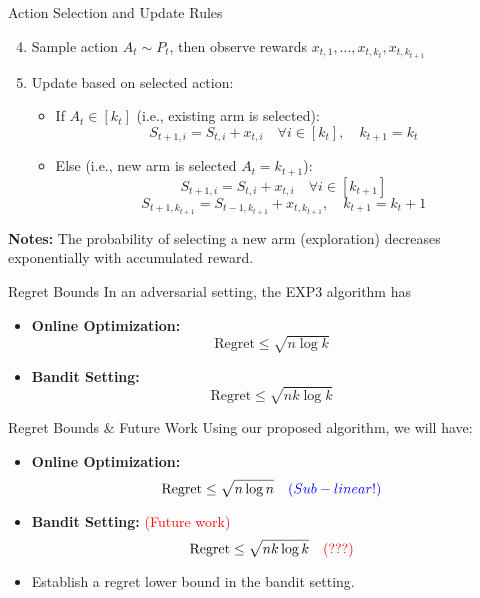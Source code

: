 \documentclass{beamer}
\begin{document}
\begin{frame}{Action Selection and Update Rules}
\begin{enumerate}
    \setcounter{enumi}{3}
    \item Sample action \( A_t \sim P_t \), then observe rewards \( x_{t,1}, \dots, x_{t,k_t}, x_{t,k_{t+1}} \)

    \item Update based on selected action:
    \begin{itemize}
        \item If \( A_t \in [k_t] \) (i.e., existing arm is selected):
        \[
        S_{t+1,i} = S_{t,i} + x_{t,i} \quad \forall i \in [k_t], \quad k_{t+1} = k_t
        \]

        \item Else (i.e., new arm is selected \( A_t = k_{t+1} \)):
        \[
        S_{t+1,i} = S_{t,i} + x_{t,i} \quad \forall i \in [k_{t+1}]
        \]
        \[
        S_{t+1,k_{t+1}} = S_{t-1,k_{t+1}} + x_{t,k_{t+1}}, \quad k_{t+1} = k_t + 1
        \]
    \end{itemize}
\end{enumerate}

\textbf{Notes:} The probability of selecting a new arm (exploration) decreases exponentially with accumulated reward.

\end{frame}


\begin{frame}{Regret Bounds}
In an adversarial setting, the EXP3 algorithm has
\vspace{1cm}
    \begin{itemize}
        \item \textbf{Online Optimization:}
        \[
        \text{Regret} \leq \sqrt{n \log k}
        \]
        \item \textbf{Bandit Setting:} 
        \[
        \text{Regret} \leq \sqrt{n k \log k}
        \]
    \end{itemize}
\end{frame}


\begin{frame}{Regret Bounds \& Future Work}
Using our proposed algorithm, we will have:
    \begin{itemize}
        \item \textbf{Online Optimization:}
        \[
        \text{Regret} \leq \sqrt{n \log n} \quad \textcolor{blue}{(Sub-linear!)}
        \]
        \item \textbf{Bandit Setting:} \textcolor{red}{(Future work)}
        \[
        \text{Regret} \leq \sqrt{n k \log k} \quad \textcolor{red}{(???)}
        \]
        \item Establish a regret lower bound in the bandit setting.
    \end{itemize}
\end{frame}
\end{document}

